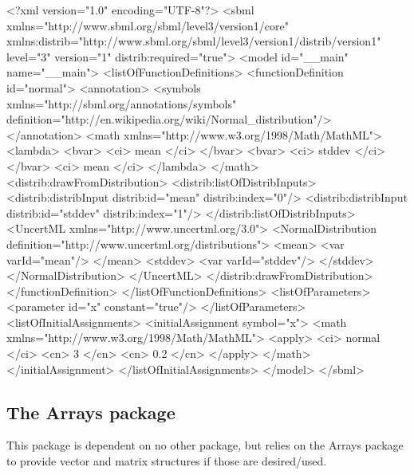 \documentclass[draftspec]{sbmlpkgspec}
\newcommand{\arrays}{Arrays\xspace}
\begin{document}
\begin{blockChanged}
\begin{example}
<?xml version="1.0" encoding="UTF-8"?>
<sbml xmlns="http://www.sbml.org/sbml/level3/version1/core"
      xmlns:distrib="http://www.sbml.org/sbml/level3/version1/distrib/version1"
      level="3" version="1" distrib:required="true">
  <model id="__main" name="__main">
    <listOfFunctionDefinitions>
      <functionDefinition id="normal">
        <annotation>
          <symbols xmlns="http://sbml.org/annotations/symbols"
                   definition="http://en.wikipedia.org/wiki/Normal_distribution"/>
        </annotation>
        <math xmlns="http://www.w3.org/1998/Math/MathML">
          <lambda>
            <bvar>
              <ci> mean </ci>
            </bvar>
            <bvar>
              <ci> stddev </ci>
            </bvar>
            <ci> mean </ci>
          </lambda>
        </math>
        <distrib:drawFromDistribution>
          <distrib:listOfDistribInputs>
            <distrib:distribInput distrib:id="mean" distrib:index="0"/>
            <distrib:distribInput distrib:id="stddev" distrib:index="1"/>
          </distrib:listOfDistribInputs>
          <UncertML xmlns="http://www.uncertml.org/3.0">
            <NormalDistribution definition="http://www.uncertml.org/distributions">
              <mean>
                <var varId="mean"/>
              </mean>
              <stddev>
                <var varId="stddev"/>
              </stddev>
            </NormalDistribution>
          </UncertML>
        </distrib:drawFromDistribution>
      </functionDefinition>
    </listOfFunctionDefinitions>
    <listOfParameters>
      <parameter id="x" constant="true"/>
    </listOfParameters>
    <listOfInitialAssignments>
      <initialAssignment symbol="x">
        <math xmlns="http://www.w3.org/1998/Math/MathML">
          <apply>
            <ci> normal </ci>
            <cn> 3 </cn>
            <cn> 0.2 </cn>
          </apply>
        </math>
      </initialAssignment>
    </listOfInitialAssignments>
  </model>
</sbml>

\end{example}


\end{blockChanged}

\subsection{The \arrays package}
This package is dependent on no other package, but relies on the \arrays package
to provide vector and matrix structures if those are desired/used.
\end{document}

